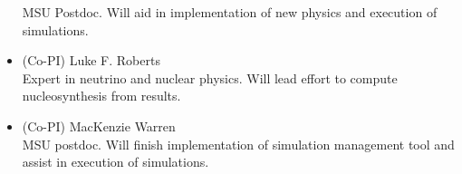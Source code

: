 \documentclass[12pt,letterpaper,english]{article}
\begin{document}
\begin{itemize}
MSU Postdoc. Will aid in implementation of new physics and execution of simulations.
\item (Co-PI) Luke F. Roberts \\
Expert in neutrino and nuclear physics. Will lead effort to compute nucleosynthesis from results.
\item (Co-PI) MacKenzie Warren \\
MSU postdoc. Will finish implementation of simulation management tool and assist in execution of simulations.

\end{itemize}
\end{document}
